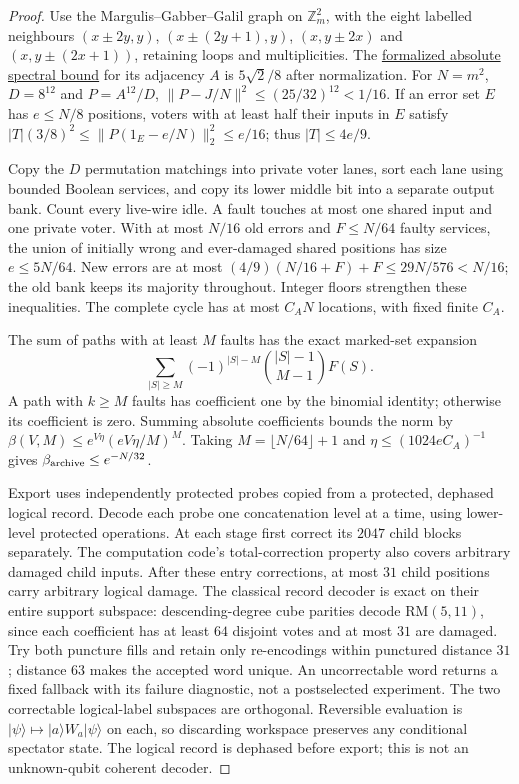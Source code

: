 \begin{proof}
Use the Margulis--Gabber--Galil graph on $\mathbb Z_m^2$, with the eight
labelled neighbours
$(x\pm2y,y)$, $(x\pm(2y+1),y)$, $(x,y\pm2x)$ and
$(x,y\pm(2x+1))$, retaining loops and multiplicities. The
\href{https://isa-afp.org/browser_info/current/AFP/Expander_Graphs/Expander_Graphs_MGG.html}{formalized absolute spectral bound}
for its adjacency $A$ is $5\sqrt2/8$ after normalization.
For $N=m^2$, $D=8^{12}$ and $P=A^{12}/D$,
$\|P-J/N\|^2\le(25/32)^{12}<1/16$.
If an error set $E$ has $e\le N/8$ positions, voters with at least half
their inputs in $E$ satisfy
$|T|(3/8)^2\le\|P(1_E-e/N)\|_2^2\le e/16$;
thus $|T|\le4e/9$.

Copy the $D$ permutation matchings into private voter lanes, sort each
lane using bounded Boolean services, and copy its lower middle bit into
a separate output bank. Count every live-wire idle. A fault touches at
most one shared input and one private voter. With at most $N/16$ old
errors and $F\le N/64$ faulty services, the union of initially wrong
and ever-damaged shared positions has size $e\le5N/64$. New errors
are at most $(4/9)(N/16+F)+F\le29N/576<N/16$; the old bank keeps
its majority throughout. Integer floors strengthen these inequalities.
The complete cycle has at most $C_A N$ locations, with fixed finite $C_A$.

The sum of paths with at least $M$ faults has the exact marked-set
expansion
\[
 \sum_{|S|\ge M}(-1)^{|S|-M}\binom{|S|-1}{M-1}F(S).
\]
A path with $k\ge M$ faults has coefficient one by the binomial identity;
otherwise its coefficient is zero. Summing absolute coefficients bounds
the norm by
$\beta(V,M)\le e^{V\eta}(eV\eta/M)^M$.
Taking $M=\lfloor N/64\rfloor+1$ and
$\eta\le(1024eC_A)^{-1}$ gives $\beta_{\rm archive}\le e^{-N/32}$.

Export uses independently protected probes copied from a protected,
dephased logical record. Decode each probe one concatenation level at a
time, using lower-level protected operations. At each stage first correct
its $2047$ child blocks separately. The computation code's total-correction
property also covers arbitrary damaged child inputs. After these entry
corrections, at most $31$ child positions carry arbitrary logical damage.
The classical record decoder is exact on their entire support subspace:
descending-degree cube parities decode RM$(5,11)$, since each coefficient
has at least $64$ disjoint votes and at most $31$ are damaged. Try both
puncture fills and retain only re-encodings within punctured distance $31$;
distance $63$ makes the accepted word unique. An uncorrectable word returns
a fixed fallback with its failure diagnostic, not a postselected experiment.
The two correctable logical-label subspaces are orthogonal. Reversible
evaluation is $|\psi\rangle\mapsto|a\rangle W_a|\psi\rangle$ on each,
so discarding workspace preserves any conditional spectator state.
The logical record is dephased before export; this is not an unknown-qubit
coherent decoder.


\end{proof}
